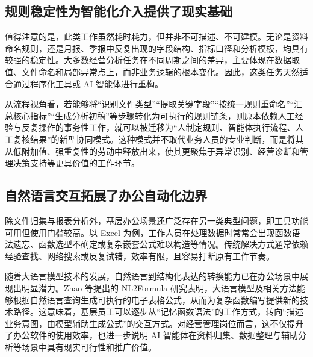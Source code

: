 \subsection{规则稳定性为智能化介入提供了现实基础}

值得注意的是，此类工作虽然耗时耗力，但并非不可描述、不可建模。无论是资料命名规则，还是月报、季报中反复出现的字段结构、指标口径和分析模板，均具有较强的稳定性。大多数经营分析任务在不同周期之间的差异，主要体现在数据取值、文件命名和局部异常点上，而非业务逻辑的根本变化。因此，这类任务天然适合通过程序化工具或 AI 智能体进行重构。

从流程视角看，若能够将“识别文件类型”“提取关键字段”“按统一规则重命名”“汇总核心指标”“生成分析初稿”等步骤转化为可执行的规则链条，则原本依赖人工经验与反复操作的事务性工作，就可以被迁移为“人制定规则、智能体执行流程、人工复核结果”的新型协同模式。这种模式并不取代业务人员的专业判断，而是将其从低附加值、强重复性的劳动中释放出来，使其更聚焦于异常识别、经营诊断和管理决策支持等更具价值的工作环节。

\subsection{自然语言交互拓展了办公自动化边界}

除文件归集与报表分析外，基层办公场景还广泛存在另一类典型问题，即工具功能可用但使用门槛较高。以 Excel 为例，工作人员在处理数据时常常会出现函数语法遗忘、函数选型不确定或复杂嵌套公式难以构造等情况。传统解决方式通常依赖经验查找、网络搜索或反复试错，效率有限，且容易打断原有工作节奏。

随着大语言模型技术的发展，自然语言到结构化表达的转换能力已在办公场景中展现出明显潜力。Zhao 等提出的 NL2Formula 研究表明，大语言模型及相关方法能够根据自然语言查询生成可执行的电子表格公式，从而为复杂函数编写提供新的技术路径\cite{zhao-etal-2024-nl2formula}。这意味着，基层员工可以逐步从“记忆函数语法”的工作方式，转向“描述业务意图，由模型辅助生成公式”的交互方式。对经营管理岗位而言，这不仅提升了办公软件的使用效率，也进一步说明 AI 智能体在资料归集、数据整理与辅助分析等场景中具有现实可行性和推广价值。
